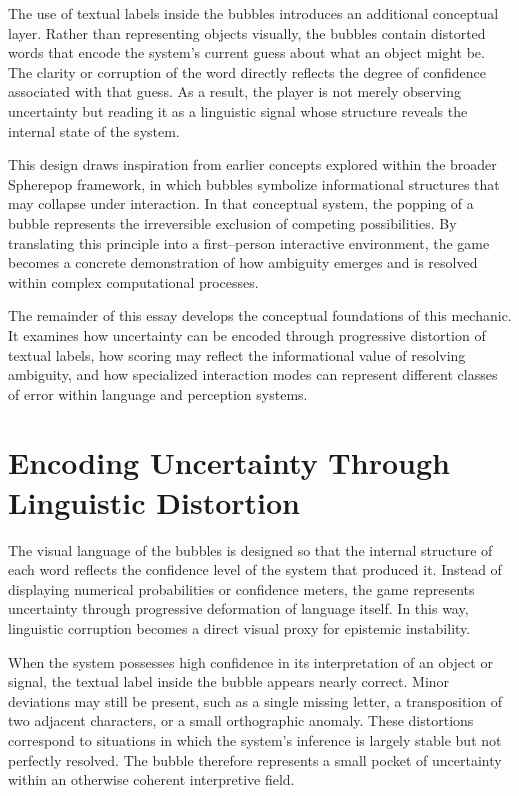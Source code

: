 \documentclass[11pt]{article}
\begin{document}
The use of textual labels inside the bubbles introduces an additional conceptual layer. Rather than representing objects visually, the bubbles contain distorted words that encode the system's current guess about what an object might be. The clarity or corruption of the word directly reflects the degree of confidence associated with that guess. As a result, the player is not merely observing uncertainty but reading it as a linguistic signal whose structure reveals the internal state of the system.

This design draws inspiration from earlier concepts explored within the broader Spherepop framework, in which bubbles symbolize informational structures that may collapse under interaction. In that conceptual system, the popping of a bubble represents the irreversible exclusion of competing possibilities. By translating this principle into a first--person interactive environment, the game becomes a concrete demonstration of how ambiguity emerges and is resolved within complex computational processes.

The remainder of this essay develops the conceptual foundations of this mechanic. It examines how uncertainty can be encoded through progressive distortion of textual labels, how scoring may reflect the informational value of resolving ambiguity, and how specialized interaction modes can represent different classes of error within language and perception systems.

\section{Encoding Uncertainty Through Linguistic Distortion}

The visual language of the bubbles is designed so that the internal structure of each word reflects the confidence level of the system that produced it. Instead of displaying numerical probabilities or confidence meters, the game represents uncertainty through progressive deformation of language itself. In this way, linguistic corruption becomes a direct visual proxy for epistemic instability.

When the system possesses high confidence in its interpretation of an object or signal, the textual label inside the bubble appears nearly correct. Minor deviations may still be present, such as a single missing letter, a transposition of two adjacent characters, or a small orthographic anomaly. These distortions correspond to situations in which the system's inference is largely stable but not perfectly resolved. The bubble therefore represents a small pocket of uncertainty within an otherwise coherent interpretive field.
\end{document}
